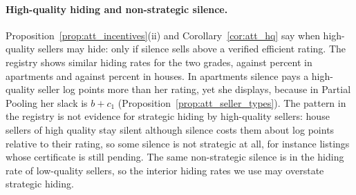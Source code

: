 \paragraph{High-quality hiding and non-strategic silence.}
Proposition~\ref{prop:att_incentives}(ii) and Corollary~\ref{cor:att_hq} say when high-quality sellers may hide: only if silence sells above a verified efficient rating. The registry shows similar hiding rates for the two grades, \attSigmaOneApt{} against \attSigmaZeroApt{} percent in apartments and \attSigmaOneHouse{} against \attSigmaZeroHouse{} percent in houses. In apartments silence pays a high-quality seller \attExcessApt{} log points more than her rating, yet she displays, because in Partial Pooling her slack is $b+c_1$ (Proposition~\ref{prop:att_seller_types}). The pattern in the registry is not evidence for strategic hiding by high-quality sellers: house sellers of high quality stay silent although silence costs them about \attHighLossHouse{} log points relative to their rating, so some silence is not strategic at all, for instance listings whose certificate is still pending. The same non-strategic silence is in the hiding rate of low-quality sellers, so the interior hiding rates we use may overstate strategic hiding.
